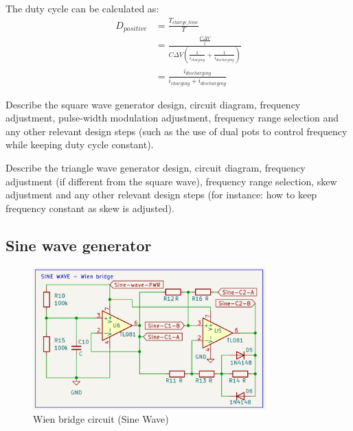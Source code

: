 \documentclass[11pt,a4paper]{article}
\begin{document}
The duty cycle can be calculated as:
\begin{equation}
	\begin{split}
		D_{positive} &= \frac{T_{charge\_time}}{T}  \\
		  					   &= \frac{\frac{C\Delta{V}}{i}}{C\Delta{V} (\frac{1}{i_{charging}} + \frac{1}{i_{discharging}})} \\
		&= \frac{i_{discharging}}{i_{charging} + i_{discharging}}
		\label{eq:Square and triangle duty}
	\end{split}
\end{equation}



Describe the square wave generator design, circuit diagram, frequency adjustment, pulse-width modulation adjustment, frequency range selection and any other relevant design steps (such as the use of dual pots to control frequency while keeping duty cycle constant).

Describe the triangle wave generator design, circuit diagram, frequency adjustment (if different from the square wave), frequency range selection, skew adjustment and any other relevant design steps (for instance: how to keep frequency constant as skew is adjusted).

\subsection{Sine wave generator}

\begin{figure}[H]
	\begin{center}
		\includegraphics[width=0.8\textwidth]{figures/hardware/schematics/wien-bridge.png}
		\caption{Wien bridge circuit (Sine Wave)}
		\label{fig:Wien bridge circuit}
	\end{center}
\end{figure}
\end{document}
